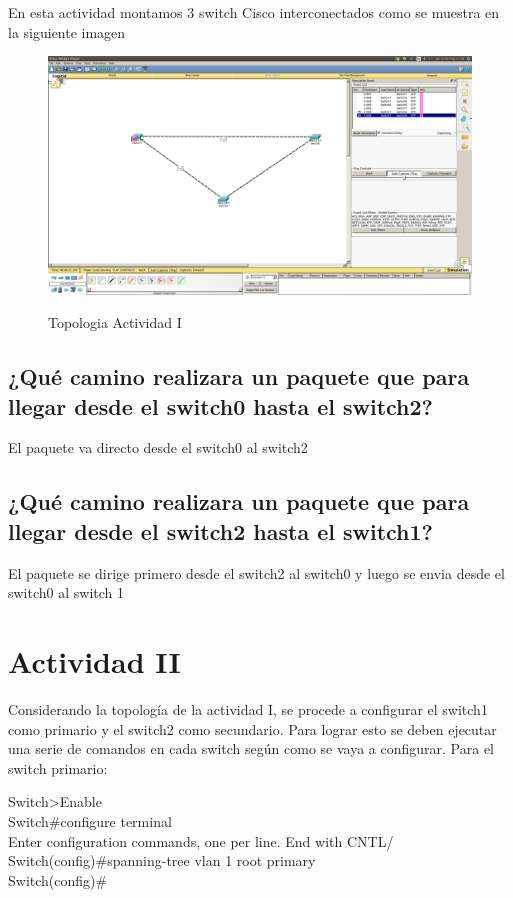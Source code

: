 \documentclass[spanish]{udpreport}
\begin{document}
En esta actividad montamos 3 switch Cisco interconectados como se muestra en la siguiente imagen 
\begin{figure}[H]
	\caption{Topologia Actividad I}
	\centering
	\includegraphics[scale=.25, bb=0 0 30 30]{imagenes/A1.png}
	\label{fig:Figura 2.1}
	\linebreak
\end{figure}

\subsection{¿Qué camino realizara un paquete que para llegar desde el switch0 hasta el switch2?}
El paquete va directo desde el switch0 al switch2
\subsection{¿Qué camino realizara un paquete que para llegar desde el switch2 hasta el switch1?}
El paquete se dirige primero desde el switch2 al switch0 y luego se envia desde el switch0 al switch 1

\section{Actividad II}
Considerando la topología de la actividad I, se procede a configurar el switch1 como primario y el switch2 como secundario. Para lograr esto se deben ejecutar una serie de comandos en cada switch según como se vaya a configurar.
Para el switch primario:
\begin{flushleft}
	Switch>Enable \\
	Switch\#configure terminal \\
	Enter configuration commands, one per line. End with CNTL/ \\
	Switch(config)\#spanning-tree vlan 1 root primary \\
	Switch(config)\# \\
\end{flushleft}
\end{document}
